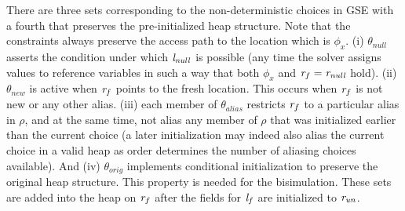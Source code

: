There are three sets corresponding to the non-deterministic choices in
GSE with a fourth that preserves the pre-initialized heap structure.
Note that the constraints always preserve the access path to the location which is $\phi_x$.
(i) $\theta_\mathit{null}$ asserts the condition under which
$\emph{l}_\mathit{null}$ is possible (any time the solver assigns
values to reference variables in such a way that both $\phi_x$ and $\emph{r}_f =
\emph{r}_\mathit{null}$ hold). (ii)
$\theta_\mathit{new}$ is active when $\emph{r}_f$ points to the
fresh location. This occurs when $\emph{r}_f$ is not new or any other alias. (iii) each member of $\theta_\mathit{alias}$ restricts $\emph{r}_f$ to
a particular alias in $\rho$, and at the same time, not alias any member of $\rho$
that was initialized earlier than the current choice (a later
initialization may indeed also alias the current choice in a valid
heap as order determines the number of aliasing choices available). And (iv) $\theta_\mathit{orig}$  implements conditional initialization to preserve the
original heap structure. This property is needed for the bisimulation. 
These sets are added into the heap on $\emph{r}_f$ after the fields for $\emph{l}_f$ are initialized to $\emph{r}_\mathit{un}$.


\begin{comment} where for each element in the set $(\cfgnt{r}_a\ \cfgnt{l}_a)
\in \rho$ it creates a constraint stating that $\cfgnt{r}_f$ is not null, points to
$\cfgnt{r}_a$, and does not point to any reference contained in $(\cfgnt{r}_a^\prime\ 
\cfgnt{l}_a^\prime) \in \rho$ such that $\cfgnt{r}_a < \cfgnt{r}_a^\prime$ based on a lexical
ordering of initialized references. Additionally,
$\theta_\mathit{orig}$ allows for the possibility that the field
continues to remain uninitialized since the heap is symbolic.
\sjp{The last statement seems to jump out since we have not been
talking about the heap being symbolic (have we?)} We refer
to initialization in the summary machine as conditional
initialization \sjp{Not sure why we say this - what does it mean
to the reader?}. Finally, the fields of the reference $\cfgnt{r}_f$ are marked
as uninitialized. In the post condition of the rule, the reference
$\cfgnt{r}_f$ points to $\theta$ which contains the union of all the
constraint location pairs sets, and the field $f$ points to the new
reference $\cfgnt{r}_f$ in the summary heap.
\end{comment}

\begin{comment}
 Note that the summarize rule invoked repeatedly until
the set of unitialized constraint location pairs for field $f$ is
empty. In other words the set $\Lambda$ is empty. This consititutes
the summarize end rule in~\figref{fig:symInit}.
\end{comment}

